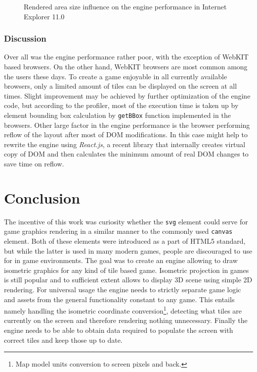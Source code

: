 \documentclass[11pt,oneside, final]{fithesis2}
\begin{document}
\begin{figure}[h]
	\centering
	
	\caption{Rendered area size influence on the engine performance in Internet Explorer 11.0}
	\label{performance-size}
\end{figure}

\subsection{Discussion}
Over all was the engine performance rather poor, with the exception of WebKIT based browsers. On the other hand, WebKIT browsers are most common among the users these days\cite{browserstats}. To create a game enjoyable in all currently available browsers, only a limited amount of tiles can be displayed on the screen at all times. Slight improvement may be achieved by further optimization of the engine code, but according to the profiler, most of the execution time is taken up by element bounding box calculation by \texttt{getBBox} function implemented in the browsers\cite{svgtypes}. Other large factor in the engine performance is the browser performing reflow of the layout after most of DOM modifications. In this case might help to rewrite the engine using \emph{React.js}, a recent library that internally creates virtual copy of DOM and then calculates the minimum amount of real DOM changes to save time on reflow\cite{sobo}.

\chapter{Conclusion}
The incentive of this work was curiosity whether the \texttt{svg} element could serve for game graphics rendering in a similar manner to the commonly used \texttt{canvas} element. Both of these elements were introduced as a part of HTML5 standard, but while the latter is used in many modern games, people are discouraged to use for in game environments. The goal was to create an engine allowing to draw isometric graphics for any kind of tile based game. Isometric projection in games is still popular and to sufficient extent allows to display 3D scene using simple 2D rendering. For universal usage the engine needs to strictly separate game logic and assets from the general functionality constant to any game. This entails namely handling the isometric coordinate conversion\footnote{Map model units conversion to screen pixels and back.}, detecting what tiles are currently on the screen and therefore rendering nothing unnecessary. Finally the engine needs to be able to obtain data required to populate the screen with correct tiles and keep those up to date.
\end{document}
